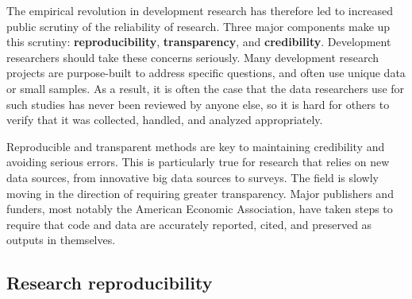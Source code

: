 The empirical revolution in development research\cite{angrist2017economic}
has therefore led to increased public scrutiny of the reliability of research.\cite{rogers_2017}
Three major components make up this scrutiny: \textbf{reproducibility}\cite{duvendack2017meant}, \textbf{transparency},\cite{christensen2018transparency} and \textbf{credibility}.\cite{ioannidis2017power}
Development researchers should take these concerns seriously.
Many development research projects are purpose-built to address specific questions,
and often use unique data or small samples.
As a result, it is often the case that the data 
researchers use for such studies has never been reviewed by anyone else,
so it is hard for others to verify that it was 
collected, handled, and analyzed appropriately.

Reproducible and transparent methods are key to maintaining credibility 
and avoiding serious errors. 
This is particularly true for research that relies on new data sources, 
from innovative big data sources to surveys. 
The field is slowly moving in the direction of requiring greater transparency. 
Major publishers and funders, most notably the American Economic Association,
have taken steps to require that code and data
are accurately reported, cited, and preserved as outputs in themselves.


\subsection{Research reproducibility}

